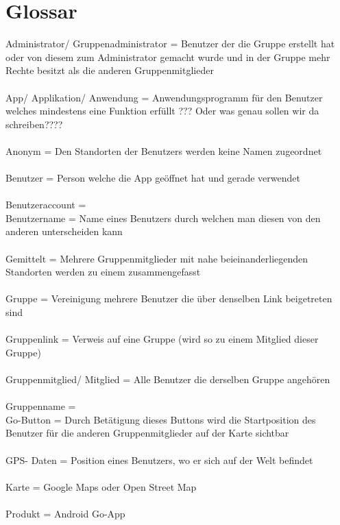 \section{Glossar}

Administrator/ Gruppenadministrator = Benutzer der die Gruppe erstellt hat oder von diesem zum Administrator gemacht wurde und in der Gruppe mehr Rechte besitzt als die anderen Gruppenmitglieder\\
\\
App/ Applikation/ Anwendung = Anwendungsprogramm für den Benutzer welches mindestens eine Funktion erfüllt ??? Oder was genau sollen wir da schreiben????\\
\\
Anonym = Den Standorten der Benutzers werden keine Namen zugeordnet\\
\\
Benutzer = Person welche die App geöffnet hat und gerade verwendet\\
\\
Benutzeraccount =
\\
Benutzername = Name eines Benutzers durch welchen man diesen von den anderen unterscheiden kann\\
\\
Gemittelt = Mehrere Gruppenmitglieder mit nahe beieinanderliegenden Standorten werden zu einem zusammengefasst\\
\\
Gruppe = Vereinigung mehrere Benutzer die über denselben Link beigetreten sind\\
\\
Gruppenlink = Verweis auf eine Gruppe (wird so zu einem Mitglied dieser Gruppe)\\
\\
Gruppenmitglied/ Mitglied = Alle Benutzer die derselben Gruppe angehören\\
\\
Gruppenname =
\\
Go-Button = Durch Betätigung dieses Buttons wird die Startposition des Benutzer für die anderen Gruppenmitglieder auf der Karte sichtbar\\
\\
GPS- Daten = Position eines Benutzers, wo er sich auf der Welt befindet\\
\\
Karte = Google Maps oder Open Street Map\\
\\
Produkt = Android Go-App\\
\\
